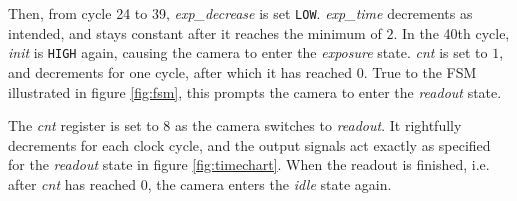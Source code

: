 Then, from cycle 24 to 39, \emph{exp\_decrease} is set \verb|LOW|. \emph{exp\_time} decrements as intended, and stays constant after it reaches the minimum of $2$. In the 40th cycle, \emph{init} is \verb|HIGH| again, causing the camera to enter the \emph{exposure} state. \emph{cnt} is set to $1$, and decrements for one cycle, after which it has reached $0$. True to the FSM illustrated in figure \ref{fig:fsm}, this prompts the camera to enter the \emph{readout} state.

The \emph{cnt} register is set to $8$ as the camera switches to \emph{readout}. It rightfully decrements for each clock cycle, and the output signals act exactly as specified for the \emph{readout} state in figure \ref{fig:timechart}. When the readout is finished, i.e. after \emph{cnt} has reached $0$, the camera enters the \emph{idle} state again.